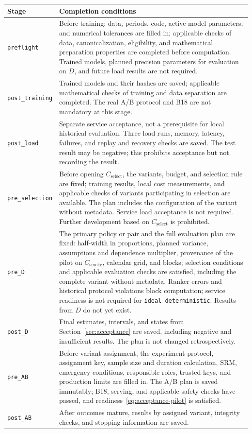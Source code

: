 \documentclass[12pt,a4paper]{article}
\newcommand{\code}[1]{{\ttfamily\small\nolinkurl{#1}}}
\theoremstyle{plainru}
\begin{document}
\begin{longtable}{L{0.18\textwidth}L{0.72\textwidth}}
\toprule Stage & Completion conditions \\\midrule\endhead
\code{preflight} &
Before training: data, periods, code, active model parameters,
and numerical tolerances are filled in; applicable checks of data, canonicalization,
eligibility, and mathematical preparation properties are completed before computation.
Trained models, planned precision parameters for evaluation on $D$,
and future load results are not required. \\
\code{post_training} &
Trained models and their hashes are saved; applicable
mathematical checks of training and data separation are completed.
The real A/B protocol and B18 are not mandatory at this stage. \\
\code{post_load} &
Separate service acceptance, not a prerequisite for local historical evaluation.
Three load runs, memory, latency, failures,
and replay and recovery checks are saved. The test result
may be negative; this prohibits acceptance but not recording the result. \\
\code{pre_selection} &
Before opening $C_{\mathrm{select}}$, the variants, budget,
and selection rule are fixed; training results, local cost
measurements, and applicable checks of variants participating in selection are available.
The plan includes the configuration of the variant without metadata.
Service load acceptance is not required.
Further development based on $C_{\mathrm{select}}$ is prohibited. \\
\code{pre_D} &
The primary policy or pair and the full evaluation plan are fixed:
half-width in proportions, planned variance, assumptions and dependence multiplier,
provenance of the pilot on $C_{\mathrm{smoke}}$, calendar grid, and blocks;
selection conditions and applicable evaluation checks are satisfied, including
the complete variant without metadata.
Ranker errors and historical protocol violations block computation;
service readiness is not required for \code{ideal_deterministic}.
Results from $D$ do not yet exist. \\
\code{post_D} &
Final estimates, intervals, and states from
Section~\ref{sec:acceptance} are saved, including negative and insufficient
results. The plan is not changed retrospectively. \\
\code{pre_AB} &
Before variant assignment, the experiment protocol,
assignment key, sample size and duration calculation, SRM, emergency conditions,
responsible roles, trusted keys, and production limits are filled in.
The A/B plan is saved immutably; B18, serving, and applicable safety
checks have passed, and readiness~\eqref{eq:acceptance-pilot} is satisfied. \\
\code{post_AB} &
After outcomes mature, results by assigned
variant, integrity checks, and stopping information are saved. \\
\bottomrule
\end{longtable}
\end{document}
